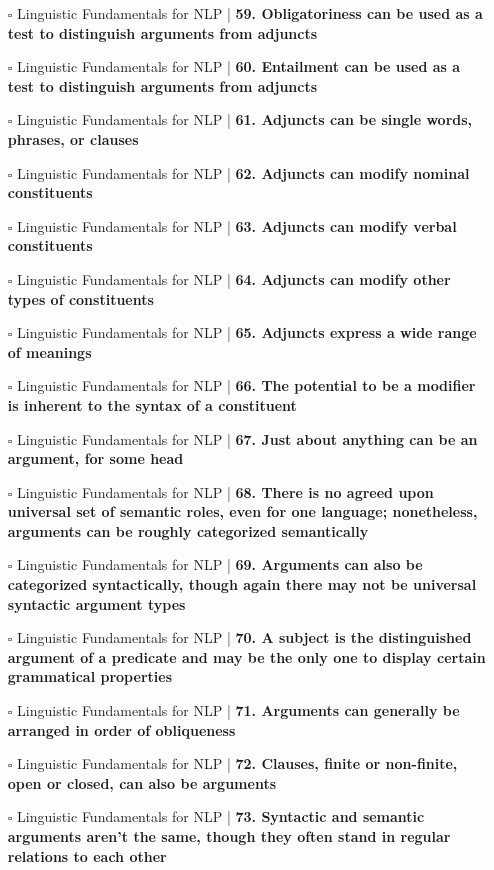\documentclass[a4, landscape, 12pt]{article}
\newcommand{\checkbox}{$\square$}%
\begin{document}
\begin{itemize}
{}
\item [\checkbox]  Linguistic Fundamentals for NLP | \textbf{ 59. Obligatoriness can be used as a test to distinguish arguments from adjuncts
}
\item [\checkbox]  Linguistic Fundamentals for NLP | \textbf{ 60. Entailment can be used as a test to distinguish arguments from adjuncts
}
\item [\checkbox]  Linguistic Fundamentals for NLP | \textbf{ 61. Adjuncts can be single words, phrases, or clauses
}
\item [\checkbox]  Linguistic Fundamentals for NLP | \textbf{ 62. Adjuncts can modify nominal constituents
}
\item [\checkbox]  Linguistic Fundamentals for NLP | \textbf{ 63. Adjuncts can modify verbal constituents
}
\item [\checkbox]  Linguistic Fundamentals for NLP | \textbf{ 64. Adjuncts can modify other types of constituents
}
\item [\checkbox]  Linguistic Fundamentals for NLP | \textbf{ 65. Adjuncts express a wide range of meanings
}
\item [\checkbox]  Linguistic Fundamentals for NLP | \textbf{ 66. The potential to be a modifier is inherent to the syntax of a constituent
}
\item [\checkbox]  Linguistic Fundamentals for NLP | \textbf{ 67. Just about anything can be an argument, for some head
}
\item [\checkbox]  Linguistic Fundamentals for NLP | \textbf{ 68. There is no agreed upon universal set of semantic roles, even for one language; nonetheless, arguments can be roughly categorized semantically
}
\item [\checkbox]  Linguistic Fundamentals for NLP | \textbf{ 69. Arguments can also be categorized syntactically, though again there may not be universal syntactic argument types
}
\item [\checkbox]  Linguistic Fundamentals for NLP | \textbf{ 70. A subject is the distinguished argument of a predicate and may be the only one to display certain grammatical properties
}
\item [\checkbox]  Linguistic Fundamentals for NLP | \textbf{ 71. Arguments can generally be arranged in order of obliqueness
}
\item [\checkbox]  Linguistic Fundamentals for NLP | \textbf{ 72. Clauses, finite or non-finite, open or closed, can also be arguments
}
\item [\checkbox]  Linguistic Fundamentals for NLP | \textbf{ 73. Syntactic and semantic arguments aren’t the same, though they often stand in regular relations to each other
}
\end{itemize}
\end{document}
